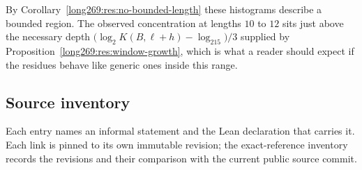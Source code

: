 \documentclass[11pt]{article}
\begin{document}
By Corollary~\ref{long269:res:no-bounded-length} these histograms describe a bounded
region.  The observed concentration at lengths $10$ to $12$ sits just above the
necessary depth $\bigl(\log_2K(B,\ell+h)-\log_215\bigr)/3$ supplied by
Proposition~\ref{long269:res:window-growth}, which is what a reader should expect if
the residues behave like generic ones inside this range.

\subsection{Source inventory}\label{long269:long:sources}

Each entry names an informal statement and the Lean declaration that carries it.
Each link is pinned to its own immutable revision; the exact-reference inventory
records the revisions and their comparison with the current public source commit.
\end{document}
